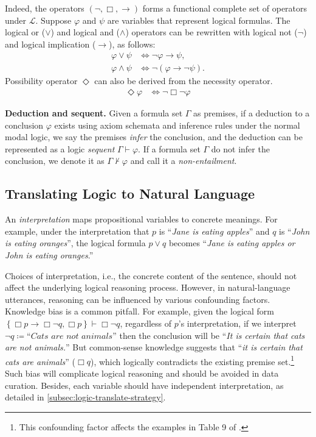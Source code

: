Indeed, the operators $\left(\lnot, \Box, \to\right)$ forms a functional complete set of operators under $\mathcal{L}$.
Suppose $\varphi$ and $\psi$ are variables that represent logical formulas.
The logical or ($\lor$) and logical and ($\land$) operators can be rewritten with logical not ($\lnot$) and logical implication ($\to$), as follows:
\noindent
\begin{align}
    \varphi \lor \psi  & \Leftrightarrow \lnot \varphi \to \psi, \label{eqn:def-lor}          \\
    \varphi \land \psi & \Leftrightarrow \lnot \left(\varphi \to \lnot \psi\right). \nonumber
\end{align}
%
Possibility operator $\Diamond$ can also be derived from the necessity operator. \begin{align}\Diamond \varphi &\Leftrightarrow \lnot \Box \lnot \varphi\end{align}

\vspace{3pt}
\noindent\textbf{Deduction and sequent.}
Given a formula set $\Gamma$ as premises, if a deduction to a conclusion $\varphi$ exists using axiom schemata and inference rules under the normal modal logic, we say the premises \textit{infer} the conclusion, and the deduction can be represented as a logic \textit{sequent} \(\Gamma \vdash \varphi\).
If a formula set $\Gamma$ do not infer the conclusion, we denote it as \(\Gamma \nvdash \varphi\) and call it a \textit{non-entailment}.


\subsection{Translating Logic to Natural Language}
\label{subsec:syn-natural-language}
An \textit{interpretation} maps propositional variables to concrete meanings.
For example, under the interpretation that $p$ is ``\textit{Jane is eating apples}'' and $q$ is ``\textit{John is eating oranges}'', the logical formula $p \lor q$ becomes ``\textit{Jane is eating apples or John is eating oranges}.''

Choices of interpretation, i.e., the concrete content of the sentence, should not affect the underlying logical reasoning process.
However, in natural-language utterances, reasoning can be influenced by various confounding factors.
Knowledge bias is a common pitfall.
For example, given the logical form \(\left\{\Box p \to \Box \lnot q, \Box p\right\} \vdash \Box \lnot q\), regardless of $p$'s interpretation, if we interpret $\lnot q\coloneqq\textit{``Cats are not animals''}$ then the conclusion will be ``\textit{It is certain that cats are not animals.}''
But common-sense knowledge suggests that ``\textit{it is certain that cats are animals}'' ($\Box q$), which logically contradicts the existing premise set.\footnote{
    This confounding factor affects the examples in Table 9 of \citet{hanFolioNaturalLanguage2024}.
}
Such bias will complicate logical reasoning \citep{lampinenLanguageModelsHumans2024} and should be avoided in data curation.
Besides, each variable should have independent interpretation, as detailed in \cref{subsec:logic-translate-strategy}.

